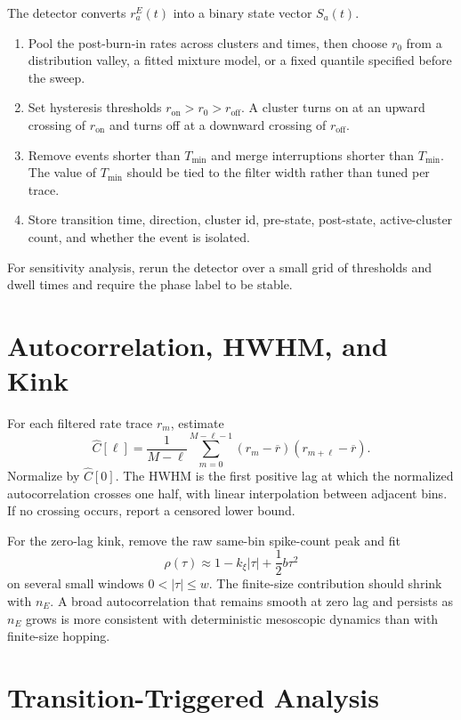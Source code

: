 The detector converts \(r_a^E(t)\) into a binary state vector \(S_a(t)\).
\begin{enumerate}
    \item Pool the post-burn-in rates across clusters and times, then choose
    \(r_0\) from a distribution valley, a fitted mixture model, or a fixed
    quantile specified before the sweep.
    \item Set hysteresis thresholds \(r_{\mathrm{on}}>r_0>r_{\mathrm{off}}\).
    A cluster turns on at an upward crossing of \(r_{\mathrm{on}}\) and turns
    off at a downward crossing of \(r_{\mathrm{off}}\).
    \item Remove events shorter than \(T_{\min}\) and merge interruptions
    shorter than \(T_{\min}\). The value of \(T_{\min}\) should be tied to the
    filter width rather than tuned per trace.
    \item Store transition time, direction, cluster id, pre-state, post-state,
    active-cluster count, and whether the event is isolated.
\end{enumerate}
For sensitivity analysis, rerun the detector over a small grid of thresholds
and dwell times and require the phase label to be stable.

\section{Autocorrelation, HWHM, and Kink}
\label{appC:autocorrelation}

For each filtered rate trace \(r_m\), estimate
\[
    \widehat C[\ell]
    =
    \frac{1}{M-\ell}
    \sum_{m=0}^{M-\ell-1}
    (r_m-\overline r)(r_{m+\ell}-\overline r).
\]
Normalize by \(\widehat C[0]\). The HWHM is the first positive lag at which the
normalized autocorrelation crosses one half, with linear interpolation between
adjacent bins. If no crossing occurs, report a censored lower bound.

For the zero-lag kink, remove the raw same-bin spike-count peak and fit
\[
    \rho(\tau)\approx 1-k_\xi|\tau|+\frac{1}{2}b\tau^2
\]
on several small windows \(0<|\tau|\le w\). The finite-size contribution
should shrink with \(n_E\). A broad autocorrelation that remains smooth at zero
lag and persists as \(n_E\) grows is more consistent with deterministic
mesoscopic dynamics than with finite-size hopping.

\section{Transition-Triggered Analysis}
\label{appC:transition-triggered}

